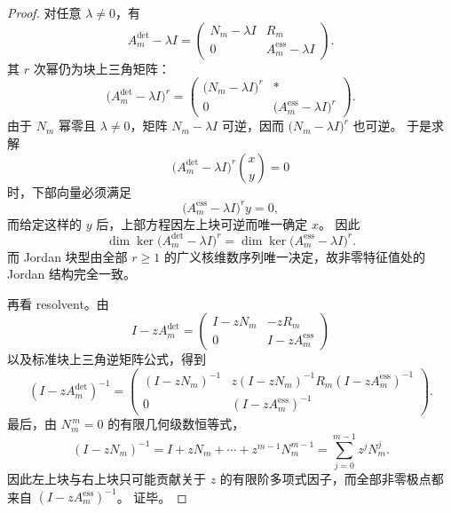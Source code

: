 \begin{proof}
对任意 \(\lambda\neq 0\)，有
\[
A_m^{\mathrm{det}}-\lambda I
=
\begin{pmatrix}
N_m-\lambda I & R_m\\
0 & A_m^{\mathrm{ess}}-\lambda I
\end{pmatrix}.
\]
其 \(r\) 次幂仍为块上三角矩阵：
\[
\bigl(A_m^{\mathrm{det}}-\lambda I\bigr)^r
=
\begin{pmatrix}
\bigl(N_m-\lambda I\bigr)^r & *\\
0 & \bigl(A_m^{\mathrm{ess}}-\lambda I\bigr)^r
\end{pmatrix}.
\]
由于 \(N_m\) 幂零且 \(\lambda\neq 0\)，矩阵 \(N_m-\lambda I\) 可逆，因而 \(\bigl(N_m-\lambda I\bigr)^r\) 也可逆。
于是求解
\[
\bigl(A_m^{\mathrm{det}}-\lambda I\bigr)^r
\binom{x}{y}=0
\]
时，下部向量必须满足
\[
\bigl(A_m^{\mathrm{ess}}-\lambda I\bigr)^r y=0,
\]
而给定这样的 \(y\) 后，上部方程因左上块可逆而唯一确定 \(x\)。
因此
\[
\dim\ker\bigl(A_m^{\mathrm{det}}-\lambda I\bigr)^r
=
\dim\ker\bigl(A_m^{\mathrm{ess}}-\lambda I\bigr)^r.
\]
而 Jordan 块型由全部 \(r\ge 1\) 的广义核维数序列唯一决定，故非零特征值处的 Jordan 结构完全一致。

再看 resolvent。由
\[
I-zA_m^{\mathrm{det}}
=
\begin{pmatrix}
I-zN_m & -zR_m\\
0 & I-zA_m^{\mathrm{ess}}
\end{pmatrix}
\]
以及标准块上三角逆矩阵公式，得到
\[
(I-zA_m^{\mathrm{det}})^{-1}
=
\begin{pmatrix}
(I-zN_m)^{-1} &
z(I-zN_m)^{-1}R_m(I-zA_m^{\mathrm{ess}})^{-1}\\
0 &
(I-zA_m^{\mathrm{ess}})^{-1}
\end{pmatrix}.
\]
最后，由 \(N_m^{\,m}=0\) 的有限几何级数恒等式，
\[
(I-zN_m)^{-1}
=
I+zN_m+\cdots+z^{m-1}N_m^{m-1}
=
\sum_{j=0}^{m-1} z^j N_m^j.
\]
因此左上块与右上块只可能贡献关于 \(z\) 的有限阶多项式因子，而全部非零极点都来自 \((I-zA_m^{\mathrm{ess}})^{-1}\)。
证毕。
\end{proof}

